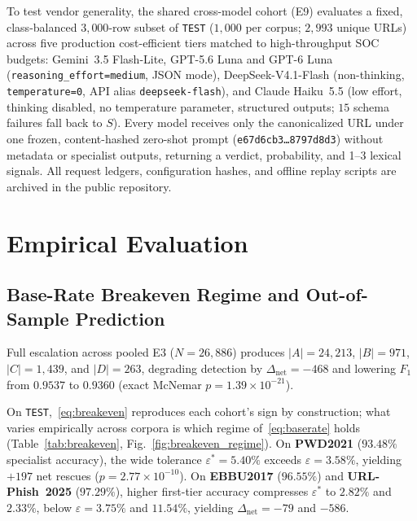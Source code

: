 \documentclass[conference,a4paper]{IEEEtran}
\newcommand{\eps}{\varepsilon}
\newcommand{\epsstar}{\eps^{\ast}}
\begin{document}
To test vendor generality, the shared cross-model cohort (E9) evaluates a fixed,
class-balanced $3{,}000$-row subset of \texttt{TEST} ($1{,}000$ per corpus;
$2{,}993$ unique URLs) across five production cost-efficient tiers matched to
high-throughput SOC budgets: Gemini~3.5 Flash-Lite, GPT-5.6 Luna and GPT-6 Luna
(\texttt{reasoning\_effort=medium}, JSON mode), DeepSeek-V4.1-Flash (non-thinking,
\texttt{temperature=0}, API alias \texttt{deepseek-flash}), and Claude Haiku~5.5
(low effort, thinking disabled, no temperature parameter, structured outputs; $15$
schema failures fall back to $S$). Every model receives only the canonicalized URL under one frozen,
content-hashed zero-shot prompt (\texttt{e67d6cb3\ldots8797d8d3}) without metadata
or specialist outputs, returning a verdict, probability, and 1--3 lexical signals.
All request ledgers, configuration hashes, and offline replay scripts are archived
in the public repository.

\section{Empirical Evaluation}
\label{sec:eval}



\subsection{Base-Rate Breakeven Regime and Out-of-Sample Prediction}
Full escalation across pooled E3 ($N=26{,}886$) produces $|A|=24{,}213$, $|B|=971$,
$|C|=1{,}439$, and $|D|=263$, degrading detection by $\Delta_{\mathrm{net}}=-468$
and lowering $F_1$ from $0.9537$ to $0.9360$ (exact McNemar
$p=1.39\times10^{-21}$).

On \texttt{TEST},~\eqref{eq:breakeven} reproduces each cohort's sign by construction;
what varies empirically across corpora is which regime of~\eqref{eq:baserate} holds
(Table~\ref{tab:breakeven}, Fig.~\ref{fig:breakeven_regime}). On \textbf{PWD2021}
($93.48\%$ specialist accuracy), the wide tolerance $\epsstar=5.40\%$ exceeds
$\eps=3.58\%$, yielding $+197$ net rescues ($p=2.77\times10^{-10}$). On
\textbf{EBBU2017} ($96.55\%$) and \textbf{URL-Phish~2025} ($97.29\%$), higher
first-tier accuracy compresses $\epsstar$ to $2.82\%$ and $2.33\%$, below
$\eps=3.75\%$ and $11.54\%$, yielding $\Delta_{\mathrm{net}}=-79$ and $-586$.
\end{document}
